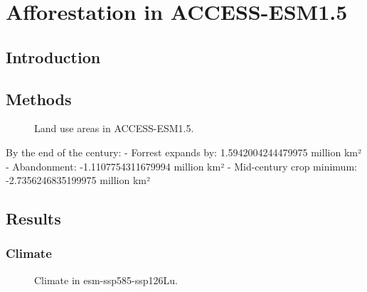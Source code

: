 \documentclass[]{article}
\begin{document}
\section{Afforestation in ACCESS-ESM1.5}

\subsection{Introduction}

\subsection{Methods}

\begin{figure}[!ht]
    \centering
    \begin{subfigure}[b]{0.45\linewidth}
        
    \end{subfigure}
    \begin{subfigure}[b]{0.45\linewidth}
        
    \end{subfigure}
    \caption{Land use areas in ACCESS-ESM1.5.}
    \label{fig:land_use}
\end{figure}

By the end of the century:
- Forrest expands by: 1.5942004244479975 million km² 
- Abandonment: -1.1107754311679994 million km²
- Mid-century crop minimum: -2.7356246835199975 million km²

\subsection{Results}

\subsubsection{Climate}

\begin{figure}[!ht]
    \begin{subfigure}[b]{0.45\linewidth}
        
    \end{subfigure}
    \begin{subfigure}[b]{0.45\linewidth}
        
    \end{subfigure}
    \begin{subfigure}[b]{0.45\linewidth}
        
    \end{subfigure}
    \begin{subfigure}[b]{0.45\linewidth}
        
    \end{subfigure}
    \caption{Climate in esm-ssp585-ssp126Lu.}
    \label{fig:climate}
\end{figure}
\end{document}
